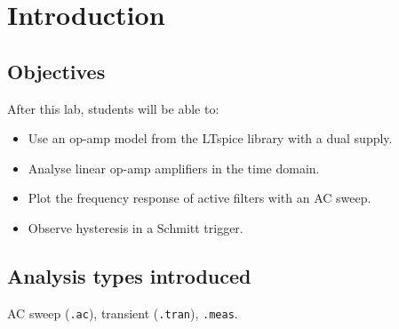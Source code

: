 \section{Introduction}


\subsection{Objectives}
After this lab, students will be able to:
\begin{itemize}[itemsep=2pt]
  \item Use an op-amp model from the LTspice library with a dual supply.
  \item Analyse linear op-amp amplifiers in the time domain.
  \item Plot the frequency response of active filters with an AC sweep.
  \item Observe hysteresis in a Schmitt trigger.
\end{itemize}

\subsection{Analysis types introduced}
AC sweep (\texttt{.ac}), transient (\texttt{.tran}), \texttt{.meas}.
